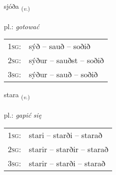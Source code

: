 \documentclass[frontgrid, backgrid]{flacards}\usepackage[]{graphicx}\usepackage[]{xcolor}
\begin{document}
\renewcommand{\flhead}{\vskip5pt \fboxsep=0pt {\small\bfseries\footnotesize Sagnorð | czasownik}}
\renewcommand{\fcfoot}{\vskip5pt \fboxsep=0pt \hspace{2pt}{\small\bfseries\footnotesize 3K}}

\renewcommand{\blhead}{\vskip5pt {\small\bfseries\footnotesize Sagnorð | czasownik }}
\renewcommand{\bcfoot}{\vskip5pt \hspace{2pt}{\small\bfseries\footnotesize 3K}}


{sjóða \small{\textsubscript{(\textit{v.})}} \\[1ex] %
\textphonetic{[sjouːða]} \\
pl.: \emph{gotować} \\  [2ex]
\renewcommand*{\arraystretch}{0.8}
\begin{tabular}{p{1cm}l}
\textsc{1sg}: & sýð -- sauð -- soðið \\ 
\textsc{2sg}: & sýður -- sauðst -- soðið \\ 
\textsc{3sg}: & sýður -- sauð -- soðið \\ 
\end{tabular}
}

\renewcommand{\flhead}{\vskip5pt \fboxsep=0pt {\small\bfseries\footnotesize Sagnorð | czasownik}}
\renewcommand{\fcfoot}{\vskip5pt \fboxsep=0pt \hspace{2pt}{\small\bfseries\footnotesize 3K}}

\renewcommand{\blhead}{\vskip5pt {\small\bfseries\footnotesize Sagnorð | czasownik }}
\renewcommand{\bcfoot}{\vskip5pt \hspace{2pt}{\small\bfseries\footnotesize 3K}}


{stara \small{\textsubscript{(\textit{v.})}} \\[1ex] %
\textphonetic{[staːra]} \\
pl.: \emph{gapić się} \\  [2ex]
\renewcommand*{\arraystretch}{0.8}
\begin{tabular}{p{1cm}l}
\textsc{1sg}: & stari -- starði -- starað \\ 
\textsc{2sg}: & starir -- starðir -- starað \\ 
\textsc{3sg}: & starir -- starði -- starað \\ 
\end{tabular}
}
\end{document}
